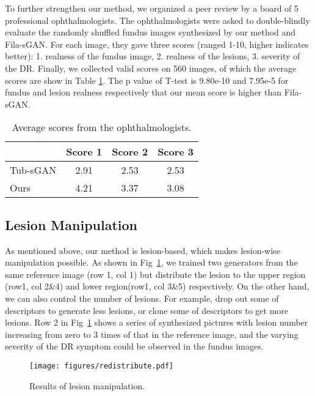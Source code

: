 \documentclass[letterpaper]{article} %
\begin{document}
	To further strengthen our method, we organized a peer review by a board of 5 professional ophthalmologists. The ophthalmologists were asked to double-blindly evaluate the randomly shuffled fundus images synthesized by our method and Fila-sGAN. For each image, they gave three scores (ranged 1-10, higher indicates better): 1. realness of the fundus image, 2. realness of the lesions, 3. severity of the DR. Finally, we collected valid scores on 560 images, of which the average scores are show in Table \ref{tab:quantitative_comparison}. The p value of T-test is 9.80e-10 and 7.95e-5 for fundus and lesion realness respectively that our mean score is higher than Fila-sGAN.

	\begin{table}[h!]
		\begin{center}
			\begin{tabularx}{0.8\columnwidth}{Xccc}
				\hline
				& Score 1 & Score 2 & Score 3 \\ \hline
				Tub-sGAN & 2.91 & 2.53 & 2.53 \\
				Ours & 4.21 & 3.37 & 3.08 \\ \hline
			\end{tabularx}
		\end{center}
		\caption{Average scores from the ophthalmologists.}
		\label{tab:quantitative_comparison}
	\end{table}

    \subsection{Lesion Manipulation}

	As mentioned above, our method is lesion-based, which makes lesion-wise manipulation possible. As shown in Fig~\ref{fig:redistribute}, we trained two generators from the same reference image (row 1, col 1) but distribute the lesion to the upper region (row1, col 2\&4) and lower region(row1, col 3\&5) respectively. On the other hand, we can also control the number of lesions. For example, drop out some of descriptors to generate less lesions, or clone some of descriptors to get more lesions. Row 2 in Fig~\ref{fig:redistribute} shows a series of synthesized pictures with lesion number increasing from zero to 3 times of that in the reference image, and the varying severity of the DR symptom could be observed in the fundus images.



	\begin{figure}[h!]
		\begin{center}
			\texttt{[image: figures/redistribute.pdf]}
		\end{center}
		\caption{Results of lesion manipulation.}
		\label{fig:redistribute}
        \end{figure}
\end{document}
